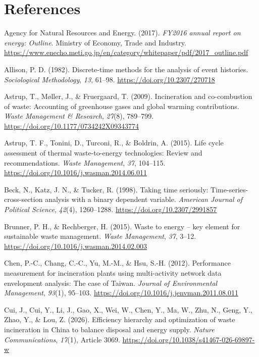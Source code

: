 \documentclass[12pt,a4paper]{article}
\begin{document}
\section*{References}
\begingroup
\small
\setlength{\parindent}{0pt}
\setlength{\parskip}{0.55em}

Agency for Natural Resources and Energy. (2017). \textit{FY2016 annual report on
energy: Outline}. Ministry of Economy, Trade and Industry.
\url{https://www.enecho.meti.go.jp/en/category/whitepaper/pdf/2017_outline.pdf}

Allison, P. D. (1982). Discrete-time methods for the analysis of event
histories. \textit{Sociological Methodology}, \textit{13}, 61--98.
\url{https://doi.org/10.2307/270718}

Astrup, T., M\o ller, J., \& Fruergaard, T. (2009). Incineration and
co-combustion of waste: Accounting of greenhouse gases and global warming
contributions. \textit{Waste Management \& Research}, \textit{27}(8), 789--799.
\url{https://doi.org/10.1177/0734242X09343774}

Astrup, T. F., Tonini, D., Turconi, R., \& Boldrin, A. (2015). Life cycle
assessment of thermal waste-to-energy technologies: Review and recommendations.
\textit{Waste Management}, \textit{37}, 104--115.
\url{https://doi.org/10.1016/j.wasman.2014.06.011}

Beck, N., Katz, J. N., \& Tucker, R. (1998). Taking time seriously:
Time-series-cross-section analysis with a binary dependent variable.
\textit{American Journal of Political Science}, \textit{42}(4), 1260--1288.
\url{https://doi.org/10.2307/2991857}

Brunner, P. H., \& Rechberger, H. (2015). Waste to energy -- key element for
sustainable waste management. \textit{Waste Management}, \textit{37}, 3--12.
\url{https://doi.org/10.1016/j.wasman.2014.02.003}

Chen, P.-C., Chang, C.-C., Yu, M.-M., \& Hsu, S.-H. (2012). Performance
measurement for incineration plants using multi-activity network data
envelopment analysis: The case of Taiwan. \textit{Journal of Environmental
Management}, \textit{93}(1), 95--103.
\url{https://doi.org/10.1016/j.jenvman.2011.08.011}

Cui, J., Cui, Y., Li, J., Gao, X., Wei, W., Chen, Y., Ma, W., Zhu, N., Geng,
Y., Zhao, Y., \& Lou, Z. (2026). Efficiency hierarchy and optimization of
waste incineration in China to balance disposal and energy supply.
\textit{Nature Communications}, \textit{17}(1), Article 3069.
\url{https://doi.org/10.1038/s41467-026-69897-w}
\end{document}
